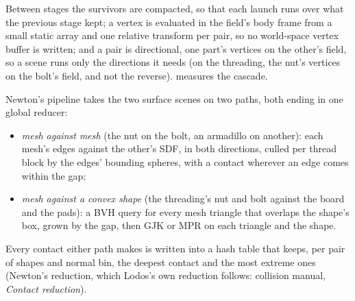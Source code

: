 Between stages the survivors are compacted, so that each launch runs over what the previous stage kept; a vertex is evaluated in the field's body frame from a small static array and one relative transform per pair, so no world-space vertex buffer is written; and a pair is directional, one part's vertices on the other's field, so a scene runs only the directions it needs (on the threading, the nut's vertices on the bolt's field, and not the reverse).  measures the cascade.

Newton's pipeline takes the two surface scenes on two paths, both ending in one global reducer:

\begin{itemize}
\item \emph{mesh against mesh} (the nut on the bolt, an armadillo on another): each mesh's edges against the other's SDF, in both directions, culled per thread block by the edges' bounding spheres, with a contact wherever an edge comes within the gap;
\item \emph{mesh against a convex shape} (the threading's nut and bolt against the board and the pads): a BVH query for every mesh triangle that overlaps the shape's box, grown by the gap, then GJK or MPR on each triangle and the shape.
\end{itemize}

Every contact either path makes is written into a hash table that keeps, per pair of shapes and normal bin, the deepest contact and the most extreme ones (Newton's reduction, which Lodos's own reduction follows: collision manual, \emph{Contact reduction}).

